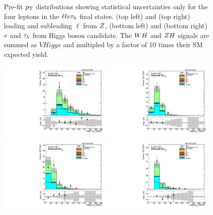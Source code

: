 \begin{figure}[htbp]
     \caption{
Pre-fit $p_\mathrm{T}$ distributions showing statistical uncertainties only for the 
four leptons in the $\ell\ell e\tau_{h}$ final states.
(top left) and (top right) leading and subleading $\ell$ from $Z$,
(bottom left) and (bottom right) $e$ and $\tau_{h}$ from Higgs boson candidate.
The $WH$ and $ZH$ signals are summed as $VHiggs$ and multipled by a factor of
10 times their SM expected yield.
     }
     \label{fig:llet_pts}
\end{figure}

\begin{figure}[htbp]
\centering
     \includegraphics[width=0.49\textwidth]{higgs_to_taus_vh/plots/zh/fr_OS_control/LLMT/pt_1.pdf}
     \includegraphics[width=0.49\textwidth]{higgs_to_taus_vh/plots/zh/fr_OS_control/LLMT/pt_2.pdf}
     \includegraphics[width=0.49\textwidth]{higgs_to_taus_vh/plots/zh/fr_OS_control/LLMT/pt_3.pdf}
     \includegraphics[width=0.49\textwidth]{higgs_to_taus_vh/plots/zh/fr_OS_control/LLMT/pt_4.pdf}

\end{figure}
